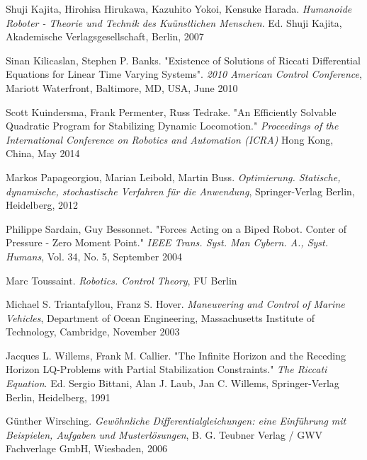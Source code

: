\begin{thebibliography}{ABCD}
Shuji Kajita, Hirohisa Hirukawa, Kazuhito Yokoi, Kensuke Harada. \emph{Humanoide Roboter - Theorie und Technik des Kuünstlichen Menschen}. Ed. Shuji Kajita, Akademische Verlagsgesellschaft, Berlin, 2007

Sinan Kilicaslan, Stephen P. Banks. "Existence of Solutions of Riccati Differential Equations for Linear Time Varying Systems". \emph{2010 American Control Conference}, Mariott Waterfront, Baltimore, MD, USA, June 2010

Scott Kuindersma, Frank Permenter, Russ Tedrake. "An Efficiently Solvable Quadratic Program for Stabilizing Dynamic Locomotion." \emph{Proceedings of the International Conference on Robotics and Automation (ICRA)} Hong Kong, China, May 2014

Markos Papageorgiou, Marian Leibold, Martin Buss. \emph{Optimierung. Statische, dynamische, stochastische Verfahren für die Anwendung}, Springer-Verlag Berlin, Heidelberg, 2012

Philippe Sardain, Guy Bessonnet. "Forces Acting on a Biped Robot. Conter of Pressure - Zero Moment Point." \emph{IEEE Trans. Syst. Man Cybern. A., Syst. Humans}, Vol. 34, No. 5, September 2004

Marc Toussaint. \emph{Robotics. Control Theory}, FU Berlin

Michael S. Triantafyllou, Franz S. Hover. \emph{Maneuvering and Control of Marine Vehicles}, Department of Ocean Engineering, Massachusetts Institute of Technology, Cambridge, November 2003

\newpage

Jacques L. Willems, Frank M. Callier. "The Infinite Horizon and the Receding Horizon LQ-Problems with Partial Stabilization Constraints." \emph{The Riccati Equation}. Ed. Sergio Bittani, Alan J. Laub, Jan C. Willems, Springer-Verlag Berlin, Heidelberg, 1991

Günther Wirsching. \emph{	
Gewöhnliche Differentialgleichungen: eine Einführung mit Beispielen, Aufgaben und Musterlösungen}, B. G. Teubner Verlag / GWV Fachverlage GmbH, Wiesbaden, 2006

\end{thebibliography}